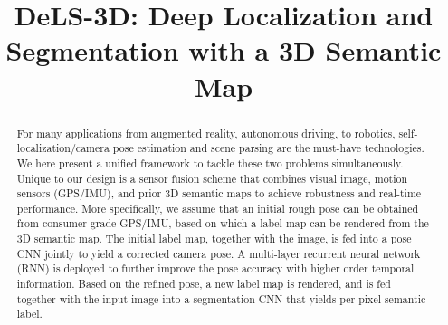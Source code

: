 \documentclass[10pt,twocolumn,letterpaper]{article}
\makeatletter
\DeclareRobustCommand\onedot{\futurelet\@let@token\@onedot}
\def\onedot{\ifx\@let@token.\else.\null\fi\xspace}
\def\eg{\emph{e.g.}}
\def\etc{\emph{etc}\onedot}
\makeatother
\begin{document}
\title{DeLS-3D: Deep Localization and Segmentation with a 3D Semantic Map}

\maketitle

\begin{abstract}

For many applications from augmented reality, autonomous driving, to robotics, self-localization/camera pose estimation and scene parsing are the must-have technologies. We here present a unified framework to tackle these two problems simultaneously. Unique to our design is a sensor fusion scheme that combines visual image, motion sensors (GPS/IMU), and prior 3D semantic maps to achieve robustness and real-time performance. More specifically, we assume that an initial rough pose can be obtained from consumer-grade GPS/IMU, based on which a label map can be rendered from the 3D semantic map. The initial label map, together with the image, is fed into a pose CNN jointly to yield a corrected camera pose.
A multi-layer recurrent neural network (RNN) is deployed to further improve the pose accuracy with higher order temporal information.
Based on the refined pose, a new label map is rendered, and is fed together with the input image into a segmentation CNN that yields per-pixel semantic label.


\end{abstract}
\end{document}
